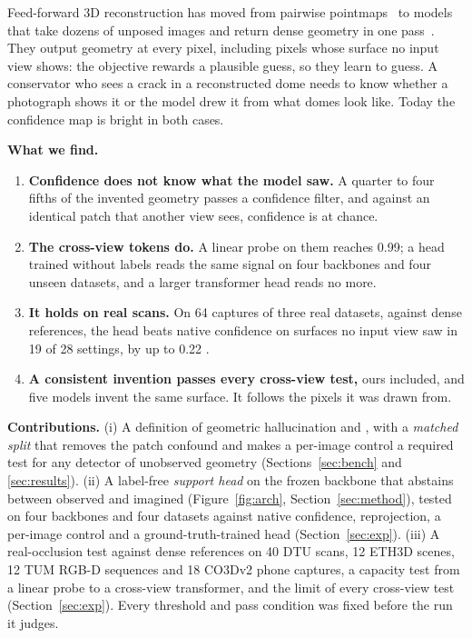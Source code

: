 \documentclass[10pt,twocolumn,letterpaper]{article}
\begin{document}
Feed-forward 3D reconstruction has moved from pairwise pointmaps~\cite{dust3r,mast3r} to models that take dozens of unposed images and return dense geometry in one pass~\cite{vggt,pi3,mapanything,da3}. They output geometry at every pixel, including pixels whose surface no input view shows: the objective rewards a plausible guess, so they learn to guess. A conservator who sees a crack in a reconstructed dome needs to know whether a photograph shows it or the model drew it from what domes look like. Today the confidence map is bright in both cases.

\begin{findings}
\textbf{What we find.}
\begin{enumerate}[leftmargin=1.2em,itemsep=1pt,topsep=1pt,parsep=0pt]
\item \textbf{Confidence does not know what the model saw.} A quarter to four fifths of the invented geometry passes a confidence filter, and against an identical patch that another view sees, confidence is at chance.
\item \textbf{The cross-view tokens do.} A linear probe on them reaches \auroc{} 0.99; a head trained without labels reads the same signal on four backbones and four unseen datasets, and a larger transformer head reads no more.
\item \textbf{It holds on real scans.} On 64 captures of three real datasets, against dense references, the head beats native confidence on surfaces no input view saw in 19 of 28 settings, by up to 0.22 \auroc.
\item \textbf{A consistent invention passes every cross-view test,} ours included, and five models invent the same surface. It follows the pixels it was drawn from.
\end{enumerate}
\end{findings}

\noindent\textbf{Contributions.}
(i) A definition of geometric hallucination and \bench{}, with a \emph{matched split} that removes the patch confound and makes a per-image control a required test for any detector of unobserved geometry (Sections~\ref{sec:bench} and \ref{sec:results}).
(ii) A label-free \emph{support head} on the frozen backbone that abstains between observed and imagined (Figure~\ref{fig:arch}, Section~\ref{sec:method}), tested on four backbones and four datasets against native confidence, reprojection, a per-image control and a ground-truth-trained head (Section~\ref{sec:exp}).
(iii) A real-occlusion test against dense references on 40 DTU scans, 12 ETH3D scenes, 12 TUM RGB-D sequences and 18 CO3Dv2 phone captures, a capacity test from a linear probe to a cross-view transformer, and the limit of every cross-view test (Section~\ref{sec:exp}).
Every threshold and pass condition was fixed before the run it judges.
\end{document}
